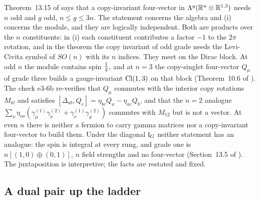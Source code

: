 \begin{remark}
\label{e3:rem:copyparity}
Theorem~13.15 of \cite{ES17} says that a copy-invariant four-vector in $\Lambda^g(\mathbb{R}^n\otimes\mathbb{R}^{1,3})$ needs $n$ odd and $g$ odd, $n\le g\le3n$. The
statement concerns the algebra and (i) concerns the module, and they are logically independent. Both are products over the $n$ constituents:
in (i) each constituent contributes a factor $-1$ to the $2\pi$ rotation, and in the theorem the copy invariant of odd grade needs the
Levi-Civita symbol of $SO(n)$ with its $n$ indices. They meet on the Dirac block. At odd $n$ the module contains spin $\tfrac12$, and at $n=3$ the
copy-singlet four-vector $Q_\mu$ of grade three builds a gauge-invariant $\mathrm{Cl}(1,3)$ on that block (Theorem~10.6 of \cite{ES17}). The check e3-6b
re-verifies that $Q_\mu$ commutes with the interior copy rotations $M_{kl}$ and satisfies $[\Delta_{ab},Q_c]=\eta_{bc}Q_a-\eta_{ac}Q_b$, and that the $n=2$
analogue $\sum_\nu\eta_{\nu\nu}(\gamma^{(1)}_\mu\gamma^{(2)}_\nu+\gamma^{(1)}_\nu\gamma^{(2)}_\mu)$ commutes with $M_{12}$ but is not a vector. At even $n$ there is
neither a fermion to carry gamma matrices nor a copy-invariant four-vector to build them. Under the diagonal $\mathfrak l_G$ neither statement has
an analogue: the spin is integral at every rung, and grade one is $n[(1,0)\oplus(0,1)]$, $n$ field strengths and no four-vector (Section~13.5
of \cite{ES17}). The juxtaposition is interpretive; the facts are restated and fixed.
\end{remark}

\subsection{A dual pair up the ladder}
\label{e3:sec:dual}

